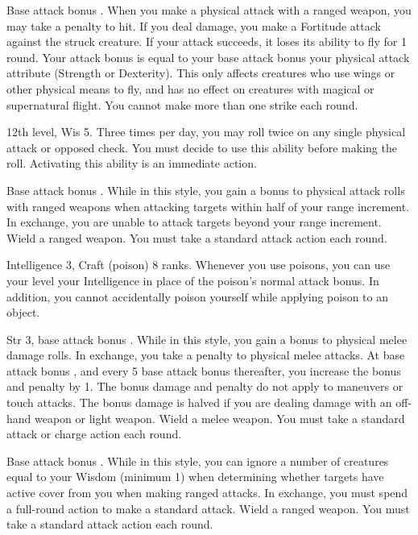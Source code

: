 \featpre Base attack bonus .
\featben When you make a physical attack with a ranged weapon, you may take a  penalty to hit. If you deal damage, you make a Fortitude attack against the struck creature. If your attack succeeds, it loses its ability to fly for 1 round. Your attack bonus is equal to your base attack bonus \add your physical attack attribute (Strength or Dexterity). This only affects creatures who use wings or other physical means to fly, and has no effect on creatures with magical or supernatural flight. You cannot make more than one strike each round.

\featpre 12th level, Wis 5.
\featben Three times per day, you may roll twice on any single physical attack or opposed check. You must decide to use this ability before making the roll. Activating this ability is an immediate action.

\featpre Base attack bonus .
 While in this style, you gain a  bonus to physical attack rolls with ranged weapons when attacking targets within half of your range increment. In exchange, you are unable to attack targets beyond your range increment.
\stylereq Wield a ranged weapon. You must take a standard attack action each round.

\featpre Intelligence 3, Craft (poison) 8 ranks.
\featben Whenever you use poisons, you can use your level \add your Intelligence in place of the poison's normal attack bonus. In addition, you cannot accidentally poison yourself while applying poison to an object.

\featpres Str 3, base attack bonus .
 While in this style, you gain a  bonus to physical melee damage rolls. In exchange, you take a  penalty to physical melee attacks. At base attack bonus , and every 5 base attack bonus thereafter, you increase the bonus and penalty by 1. The bonus damage and penalty do not apply to maneuvers or touch attacks. The bonus damage is halved if you are dealing damage with an off-hand weapon or light weapon.
\stylereq Wield a melee weapon. You must take a standard attack or charge action each round.

\featpre Base attack bonus .
 While in this style, you can ignore a number of creatures equal to your Wisdom (minimum 1) when determining whether targets have active cover from you when making ranged attacks. In exchange, you must spend a full-round action to make a standard attack.
\stylereq Wield a ranged weapon. You must take a standard attack action each round.


